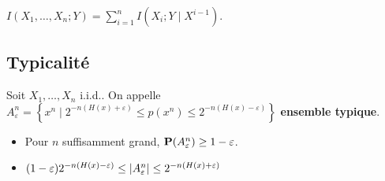 \begin{thm}
	$I(X_1,\ldots,X_n ; Y) = \sum_{i = 1}^n I(X_i ; Y \mid X^{i - 1})$.
\end{thm}

\subsection{Typicalité}

	\begin{defn}
		Soit $X_1,\ldots,X_n$ i.i.d..
		On appelle $A_\varepsilon^n = \left\{ x^n \mid 2^{-n(H(x) + \varepsilon)} \leq p(x^n) \leq 2^{-n(H(x) - \varepsilon)} \right\}$ \textbf{ensemble typique}.
	\end{defn}

	\begin{thm}
		\begin{itemize}
			\item[\textbullet] Pour $n$ suffisamment grand, $\mathbf{P}(A_\varepsilon^n) \geq 1 - \varepsilon$.
			\item[\textbullet] $(1 - \varepsilon) 2^{-n(H(x) - \varepsilon)} \leq \left\lvert A_\varepsilon^n\right\rvert \leq 2^{-n(H(x) + \varepsilon)}$
		\end{itemize}
	\end{thm}

